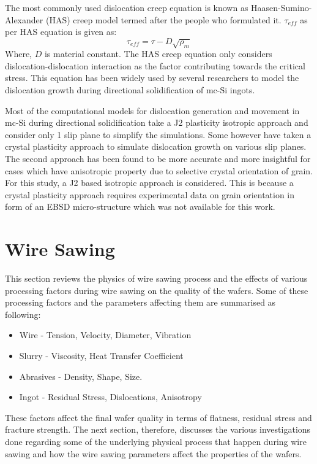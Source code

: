 The most commonly used dislocation creep equation is known as Haasen-Sumino-Alexander (HAS) creep model \cite{miyazaki2007dislocation,haasen1962plastischen} termed after the people who formulated it. $\tau_{eff}$ as per HAS equation is given as:
\begin{equation}
   \tau_{eff} = \tau -  D\sqrt{\rho_{m}} \label{has-creep}
\end{equation}
Where, $D$ is material constant. The HAS creep equation only considers dislocation-dislocation interaction as the factor contributing towards the critical stress. This equation has been widely used by several researchers \cite{} to model the dislocation growth during directional solidification of mc-Si ingots.

Most of the computational models for dislocation generation and movement in mc-Si during directional solidification \cite{} take a J2 plasticity isotropic approach and consider only 1 slip plane to simplify the simulations. Some however \cite{} have taken a crystal plasticity approach to simulate dislocation growth on various slip planes. The second approach has been found to be more accurate \cite{} and more insightful for cases which have anisotropic property due to selective crystal orientation of grain.  For this study, a J2 based isotropic approach is considered. This is because a crystal plasticity approach requires experimental data on grain orientation in form of an EBSD micro-structure \cite{} which was not available for this work. 


\section{Wire Sawing}
This section reviews the physics of wire sawing process and the effects of various processing factors during wire sawing on the quality of the wafers. Some of these processing factors and the parameters affecting them are summarised as following:
\begin{itemize}
\item
Wire - Tension, Velocity, Diameter, Vibration
\item
Slurry - Viscosity, Heat Transfer Coefficient
\item
Abrasives - Density, Shape, Size.
\item
Ingot - Residual Stress, Dislocations, Anisotropy
\end{itemize}


These factors affect the final wafer quality in terms of flatness, residual stress and fracture strength. The next section, therefore, discusses the various investigations done regarding some of the underlying physical process that happen during wire sawing and how the wire sawing parameters affect the properties of the wafers.

